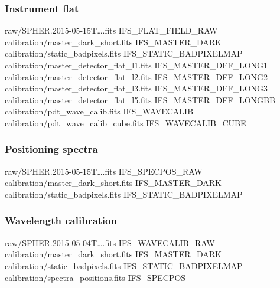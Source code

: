\documentclass[twoside,single]{lion-msc}
\begin{document}
\subsubsection*{Instrument flat}
\begin{mdframed}[linewidth = 0.3mm, linecolor = black]
raw/SPHER.2015-05-15T\dots.fits IFS\_FLAT\_FIELD\_RAW\\
calibration/master\_dark\_short.fits IFS\_MASTER\_DARK\\
calibration/static\_badpixels.fits IFS\_STATIC\_BADPIXELMAP\\
calibration/master\_detector\_flat\_l1.fits IFS\_MASTER\_DFF\_LONG1\\
calibration/master\_detector\_flat\_l2.fits IFS\_MASTER\_DFF\_LONG2\\
calibration/master\_detector\_flat\_l3.fits IFS\_MASTER\_DFF\_LONG3\\
calibration/master\_detector\_flat\_l5.fits IFS\_MASTER\_DFF\_LONGBB\\
calibration/pdt\_wave\_calib.fits IFS\_WAVECALIB\\
calibration/pdt\_wave\_calib\_cube.fits IFS\_WAVECALIB\_CUBE
\end{mdframed}

\subsubsection*{Positioning spectra}
\begin{mdframed}[linewidth = 0.3mm, linecolor = black]
raw/SPHER.2015-05-15T\dots.fits IFS\_SPECPOS\_RAW\\
calibration/master\_dark\_short.fits IFS\_MASTER\_DARK\\
calibration/static\_badpixels.fits IFS\_STATIC\_BADPIXELMAP
\end{mdframed}

\subsubsection*{Wavelength calibration}
\begin{mdframed}[linewidth = 0.3mm, linecolor = black]
raw/SPHER.2015-05-04T\dots.fits IFS\_WAVECALIB\_RAW\\
calibration/master\_dark\_short.fits IFS\_MASTER\_DARK\\
calibration/static\_badpixels.fits IFS\_STATIC\_BADPIXELMAP\\
calibration/spectra\_positions.fits IFS\_SPECPOS
\end{mdframed}
\end{document}
